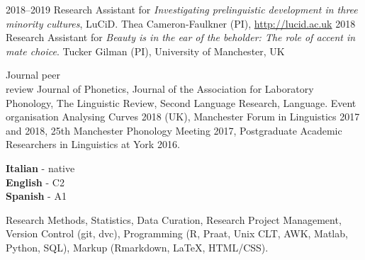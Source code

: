 \documentclass[9pt]{developercv} %
\begin{document}

\begin{entrylist}
	\entry
		{2018--2019}
		{\textnormal{Research Assistant for \textit{Investigating prelinguistic development in three minority cultures}, LuCiD.}}
		{}
		{Thea Cameron-Faulkner (PI), \url{http://lucid.ac.uk}}
	\entry
		{2018}
		{\textnormal{Research Assistant for \textit{Beauty is in the ear of the beholder: The role of accent in mate choice}.}}
		{}
		{Tucker Gilman (PI), University of Manchester, UK}
\end{entrylist}



\begin{entrylist}
	\entry
		{Journal peer \\ review}
		{\textnormal{Journal of Phonetics, Journal of the Association for Laboratory Phonology, The Linguistic Review, Second Language Research, Language.}}
		{}
		{}
	\entry
		{Event organisation}
		{\textnormal{Analysing Curves 2018 (UK), Manchester Forum in Linguistics 2017 and 2018, 25th Manchester Phonology Meeting 2017, Postgraduate Academic Researchers in Linguistics at York 2016.}}
		{}
		{}
\end{entrylist}


\begin{minipage}[t]{0.3\textwidth}
	\vspace{-\baselineskip} %


	\textbf{Italian} - native\\
	\textbf{English} - C2 \\
	\textbf{Spanish} - A1
\end{minipage}
\begin{minipage}[t]{0.6\textwidth}
	\vspace{-\baselineskip} %


	Research Methods, Statistics, Data Curation, Research Project Management, Version Control (git, dvc), Programming (R, Praat, Unix CLT, AWK, Matlab, Python, SQL), Markup (Rmarkdown, \LaTeX{}, HTML/CSS).
\end{minipage}


\end{document}
